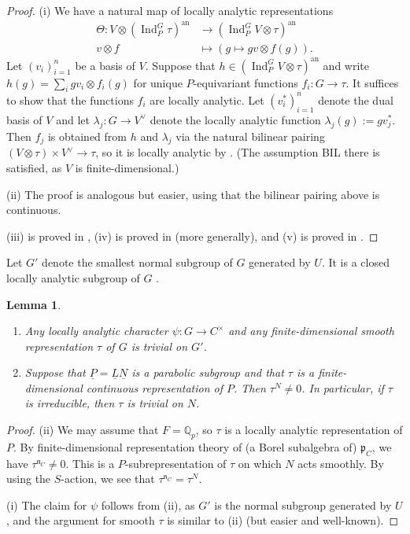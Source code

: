 \documentclass[a4paper]{amsart}
\numberwithin{equation}{section}
\newtheorem{lem}[thm]{Lemma}
\theoremstyle{remark}
\theoremstyle{definition}
\DeclareMathOperator{\Ind}{Ind}
\newcommand{\Q}{\mathbb{Q}}
\newcommand{\alggrp}[1]{\underline{#1}}
\newcommand{\an}{\mathrm{an}}
\begin{document}
\begin{proof}
  (i) We have a natural map of locally analytic representations
  \begin{align*}
    \Theta : V \otimes (\Ind_{P}^{G}\tau)^{\an} &\to (\Ind_{P}^{G}V \otimes \tau)^{\an}\\
    v \otimes f &\mapsto (g \mapsto gv \otimes f(g)).
  \end{align*}
  Let $(v_i)_{i=1}^n$ be a basis of $V$.
  Suppose that $h \in (\Ind_{P}^{G}V \otimes \tau)^{\an}$ and write $h(g) = \sum_i gv_i \otimes f_i(g)$
  for unique $P$-equivariant functions $f_i : G \to \tau$. 
  It suffices to show that the functions $f_i$ are locally analytic.
  Let $(v_i^*)_{i=1}^n$ denote the dual basis of $V$ and let $\lambda_j : G \to V^\vee$ denote the locally analytic function $\lambda_j(g) := gv_j^*$.
  Then $f_j$ is obtained from $h$ and $\lambda_j$ via the natural bilinear pairing
  $(V \otimes \tau) \times V^\vee \to \tau$, so it is locally analytic by \cite[Satz 2.4.3]{feaux-diss}.
  (The assumption BIL there is satisfied, as $V$ is finite-dimensional.)

  (ii) The proof is analogous but easier, using that the bilinear pairing above is continuous.

  (iii) is proved in \cite[Theorem 3.6]{fu}, (iv) is proved in \cite[Proposition 3.6.15]{locallyanalytic-memoir}
  (more generally), and (v) is proved in \cite[Proposition 6.2.6]{locallyanalytic-memoir}.
\end{proof}

Let $G'$ denote the smallest normal subgroup of $G$ generated by $U$.
It is a closed locally analytic subgroup of $G$ \cite[\S6]{MR316587}.

\begin{lem}\label{lm:loc-an-char}\ 
  \begin{enumerate}
  \item 
    Any locally analytic character $\psi \colon G \to C^{\times}$ and any finite-dimensional smooth representation $\tau$ of $G$ is trivial on $G'$.
  \item 
    Suppose that $\alggrp{P} = \alggrp{L}\alggrp{N}$ is a parabolic subgroup and that $\tau$ is a finite-dimensional continuous representation of $P$.
    Then $\tau^N \ne 0$.
    In particular, if $\tau$ is irreducible, then $\tau$ is trivial on $N$.
  \end{enumerate}
\end{lem}

\begin{proof}
  (ii) We may assume that $F = \Q_p$, so $\tau$ is a locally analytic representation of $P$.
  By finite-dimensional representation theory of (a Borel subalgebra of) $\mathfrak{p}_C$, we have $\tau^{\mathfrak{n}_{C}}\ne 0$.
  This is a $P$-subrepresentation of $\tau$ on which $N$ acts smoothly.
  By using the $S$-action, we see that $\tau^{\mathfrak{n}_{C}} = \tau^N$.

  (i) The claim for $\psi$ follows from (ii), as $G'$ is the normal subgroup generated by $U$, and the argument for smooth $\tau$ is similar to (ii) (but easier and well-known).
\end{proof}
\end{document}

